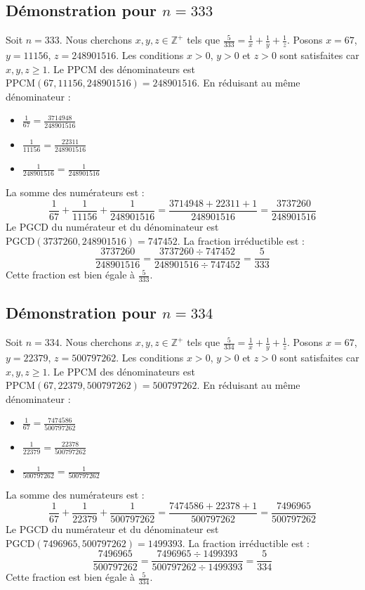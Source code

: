 \documentclass[11pt,a4paper]{article}
\begin{document}
\subsection{Démonstration pour $n = 333$}
Soit $n = 333$. Nous cherchons $x, y, z \in \mathbb{Z}^{+}$ tels que $\frac{5}{333} = \frac{1}{x} + \frac{1}{y} + \frac{1}{z}$.
Posons $x = 67$, $y = 11156$, $z = 248901516$.
Les conditions $x > 0$, $y > 0$ et $z > 0$ sont satisfaites car $x, y, z \geq 1$.
Le PPCM des dénominateurs est $\text{PPCM}(67, 11156, 248901516) = 248901516$.
En réduisant au même dénominateur :
\begin{itemize}
    \item $\frac{1}{67} = \frac{3714948}{248901516}$
    \item $\frac{1}{11156} = \frac{22311}{248901516}$
    \item $\frac{1}{248901516} = \frac{1}{248901516}$
\end{itemize}
La somme des numérateurs est :
$$ \frac{1}{67} + \frac{1}{11156} + \frac{1}{248901516} = \frac{3714948 + 22311 + 1}{248901516} = \frac{3737260}{248901516} $$
Le PGCD du numérateur et du dénominateur est $\text{PGCD}(3737260, 248901516) = 747452$.
La fraction irréductible est :
$$ \frac{3737260}{248901516} = \frac{3737260 \div 747452}{248901516 \div 747452} = \frac{5}{333} $$
Cette fraction est bien égale à $\frac{5}{333}$.

\subsection{Démonstration pour $n = 334$}
Soit $n = 334$. Nous cherchons $x, y, z \in \mathbb{Z}^{+}$ tels que $\frac{5}{334} = \frac{1}{x} + \frac{1}{y} + \frac{1}{z}$.
Posons $x = 67$, $y = 22379$, $z = 500797262$.
Les conditions $x > 0$, $y > 0$ et $z > 0$ sont satisfaites car $x, y, z \geq 1$.
Le PPCM des dénominateurs est $\text{PPCM}(67, 22379, 500797262) = 500797262$.
En réduisant au même dénominateur :
\begin{itemize}
    \item $\frac{1}{67} = \frac{7474586}{500797262}$
    \item $\frac{1}{22379} = \frac{22378}{500797262}$
    \item $\frac{1}{500797262} = \frac{1}{500797262}$
\end{itemize}
La somme des numérateurs est :
$$ \frac{1}{67} + \frac{1}{22379} + \frac{1}{500797262} = \frac{7474586 + 22378 + 1}{500797262} = \frac{7496965}{500797262} $$
Le PGCD du numérateur et du dénominateur est $\text{PGCD}(7496965, 500797262) = 1499393$.
La fraction irréductible est :
$$ \frac{7496965}{500797262} = \frac{7496965 \div 1499393}{500797262 \div 1499393} = \frac{5}{334} $$
Cette fraction est bien égale à $\frac{5}{334}$.
\end{document}

